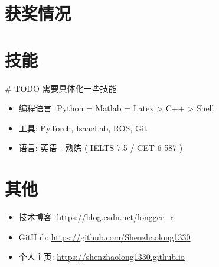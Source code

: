 

\section{获奖情况}

\section{技能}
# TODO 需要具体化一些技能
\begin{itemize}[parsep=0.5ex]
  \item 编程语言: Python = Matlab = Latex > C++ > Shell
  \item 工具: PyTorch, IsaacLab, ROS, Git
  \item 语言: 英语 - 熟练 ( IELTS 7.5 / CET-6 587 )
\end{itemize}

\section{其他}
\begin{itemize}[parsep=0.5ex]
  \item 技术博客: \href{https://blog.csdn.net/longger\_r}{https://blog.csdn.net/longger\_r}
  \item GitHub: \href{https://github.com/Shenzhaolong1330}{https://github.com/Shenzhaolong1330}
  \item 个人主页: \href{https://shenzhaolong1330.github.io}{https://shenzhaolong1330.github.io}
\end{itemize}


